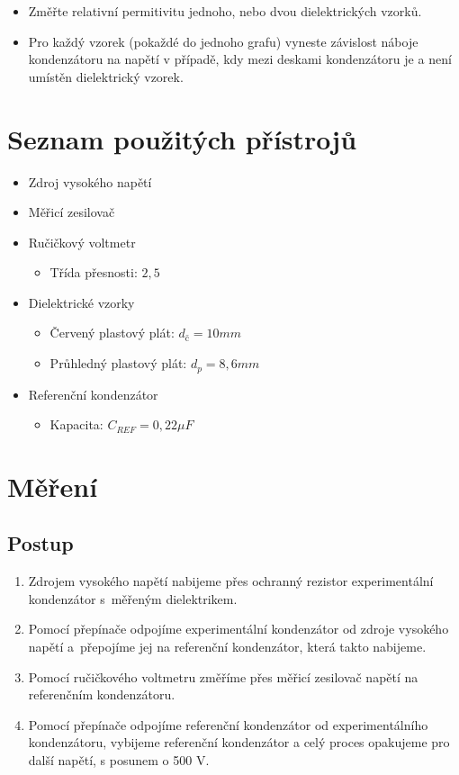 \documentclass[a4paper,12pt]{article}
\begin{document}
\begin{itemize}
    \item Změřte relativní permitivitu jednoho, nebo dvou dielektrických vzorků.
    \item Pro každý vzorek (pokaždé do jednoho grafu) vyneste závislost náboje kondenzátoru na napětí v případě, kdy mezi deskami kondenzátoru je a není umístěn dielektrický vzorek.
\end{itemize}
\section{Seznam použitých přístrojů}
\begin{itemize}
    \item Zdroj vysokého napětí
    \item Měřicí zesilovač
    \item Ručičkový voltmetr
        \begin{itemize}
        \item Třída přesnosti: $2,5$
    \end{itemize}
    \item Dielektrické vzorky
        \begin{itemize}
        \item Červený plastový plát: $d_{č} = 10 mm$
        \item Průhledný plastový plát: $d_{p} = 8,6 mm$
    \end{itemize}
    \item Referenční kondenzátor
        \begin{itemize}
        \item Kapacita: $C_{REF} = 0,22 \mu F$
    \end{itemize}
\end{itemize}
\section{Měření}
\subsection{Postup}
\begin{enumerate}
    \item Zdrojem vysokého napětí nabijeme přes ochranný rezistor experimentální kondenzátor s~měřeným dielektrikem.
    \item Pomocí přepínače odpojíme experimentální kondenzátor od zdroje vysokého napětí a~přepojíme jej na referenční kondenzátor, která takto nabijeme.
    \item Pomocí ručičkového voltmetru změříme přes měřicí zesilovač napětí na referenčním kondenzátoru.
    \item Pomocí přepínače odpojíme referenční kondenzátor od experimentálního kondenzátoru, vybijeme referenční kondenzátor a celý proces opakujeme pro další napětí, s posunem o 500 V.
\end{enumerate}
\end{document}

